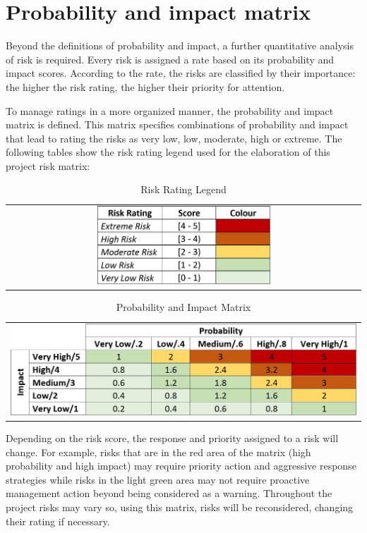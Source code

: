 \section{Probability and impact matrix}
Beyond the definitions of probability and impact, a further quantitative analysis of risk is required. Every risk is assigned a rate based on its probability and impact scores. According to the rate, the risks are classified by their importance: the higher the risk rating, the higher their priority for attention.

To manage ratings in a more organized manner, the probability and impact matrix is defined. This matrix specifies combinations of probability and impact that lead to rating the risks as very low, low, moderate, high or extreme. The following tables show the risk rating legend used for the elaboration of this project risk matrix:
\begin{table}[H]
\centering
\begin{tabular}{c}
	\includegraphics[width=0.5\textwidth]{./images/RiskRating}
\end{tabular}
\caption{Risk Rating Legend}
\end{table}
\begin{table}[H]
	\centering
	\begin{tabular}{c}
	\includegraphics[width=\textwidth]{./images/Probability_and_impact_matrix}
	\end{tabular}
	\caption{Probability and Impact Matrix}
\end{table}
Depending on the risk score, the response and priority assigned to a risk will change. For example, risks that are in the red area of the matrix (high probability and high impact) may require priority action and aggressive response strategies while risks in the light green area may not require proactive management action beyond being considered as a warning.
Throughout the project risks may vary so, using this matrix, risks will be reconsidered, changing their rating if necessary.
